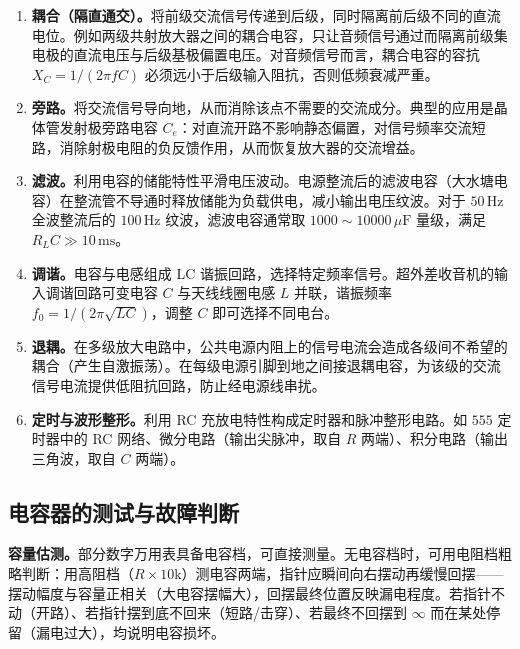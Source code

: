 \documentclass[12pt,UTF8]{ctexbook}
\begin{document}
\begin{enumerate}
\item \textbf{耦合（隔直通交）。}将前级交流信号传递到后级，同时隔离前后级不同的直流电位。例如两级共射放大器之间的耦合电容，只让音频信号通过而隔离前级集电极的直流电压与后级基极偏置电压。对音频信号而言，耦合电容的容抗 $X_C = 1/(2\pi f C)$ 必须远小于后级输入阻抗，否则低频衰减严重。

\item \textbf{旁路。}将交流信号导向地，从而消除该点不需要的交流成分。典型的应用是晶体管发射极旁路电容 $C_e$：对直流开路不影响静态偏置，对信号频率交流短路，消除射极电阻的负反馈作用，从而恢复放大器的交流增益。

\item \textbf{滤波。}利用电容的储能特性平滑电压波动。电源整流后的滤波电容（大水塘电容）在整流管不导通时释放储能为负载供电，减小输出电压纹波。对于 $50\,\mathrm{Hz}$ 全波整流后的 $100\,\mathrm{Hz}$ 纹波，滤波电容通常取 $1000\sim10000\,\mu\mathrm{F}$ 量级，满足 $R_L C \gg 10\,\mathrm{ms}$。

\item \textbf{调谐。}电容与电感组成 LC 谐振回路，选择特定频率信号。超外差收音机的输入调谐回路可变电容 $C$ 与天线线圈电感 $L$ 并联，谐振频率 $f_0 = 1/(2\pi\sqrt{LC})$，调整 $C$ 即可选择不同电台。

\item \textbf{退耦。}在多级放大电路中，公共电源内阻上的信号电流会造成各级间不希望的耦合（产生自激振荡）。在每级电源引脚到地之间接退耦电容，为该级的交流信号电流提供低阻抗回路，防止经电源线串扰。

\item \textbf{定时与波形整形。}利用 RC 充放电特性构成定时器和脉冲整形电路。如 $555$ 定时器中的 RC 网络、微分电路（输出尖脉冲，取自 $R$ 两端）、积分电路（输出三角波，取自 $C$ 两端）。
\end{enumerate}

\subsection{电容器的测试与故障判断}

\textbf{容量估测。}部分数字万用表具备电容档，可直接测量。无电容档时，可用电阻档粗略判断：用高阻档（$R \times 10\mathrm{k}$）测电容两端，指针应瞬间向右摆动再缓慢回摆——摆动幅度与容量正相关（大电容摆幅大），回摆最终位置反映漏电程度。若指针不动（开路）、若指针摆到底不回来（短路/击穿）、若最终不回摆到 $\infty$ 而在某处停留（漏电过大），均说明电容损坏。
\end{document}
